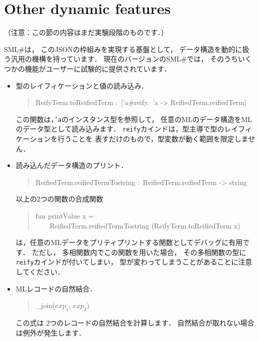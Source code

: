 \documentclass{jbook}
\newcommand{\txt}[2]{#2}
\newcommand{\smlsharp}{SML\#}
\newenvironment{program}{\begin{quote}\begin{tt}}%
                        {\end{tt}\end{quote}}
\begin{document}
\fi%

\section{
\txt{データの動的解析に基づくその他の拡張}
    {Other dynamic features}
}

\ifjp%
	（注意：この節の内容はまだ実験段階のものです．）

	\smlsharp{}は，
このJSONの枠組みを実現する基盤として，
データ構造を動的に扱う汎用の機構を持っています．
	現在のバージョンの\smlsharp{}では，
そのうちいくつかの機能がユーザーに試験的に提供されています．

\begin{itemize}
\item
	型のレイフィケーションと値の読み込み．
\begin{program}
ReifyTerm.toReifiedTerm :\ ['a\#reify.\ 'a -> ReifiedTerm.reifiedTerm]
\end{program}
	この関数は，{\tt 'a}のインスタンス型を参照して，
任意のMLのデータ構造をMLのデータ型として読み込みます．
	{\tt reify}カインドは，型主導で型のレイフィケーションを行うことを
表すだけのもので，型変数が動く範囲を限定しません．
\item
	読み込んだデータ構造のプリント．
\begin{program}
ReifiedTerm.reifiedTermTostring :\ ReifiedTerm.reifiedTerm -> string
\end{program}

	以上の2つの関数の合成関数
\begin{program}
fun printValue x =\\
\ \ \ \ ReifiedTerm.reifiedTermTostring (ReifyTerm.toReifiedTerm x)
\end{program}
は，任意のMLデータをプリティプリントする関数としてデバッグに有用です．
	ただし，
多相関数内でこの関数を用いた場合，
その多相関数の型に{\tt reify}カインドが付いてしまい，
型が変わってしまうことがあることに注意してください．

\item
	MLレコードの自然結合．
\begin{program}
\_join($\mathit{exp}_1$, $\mathit{exp}_2$)
\end{program}
	この式は
2つのレコードの自然結合を計算します．
	自然結合が取れない場合は例外が発生します．

\end{itemize}
\end{document}
